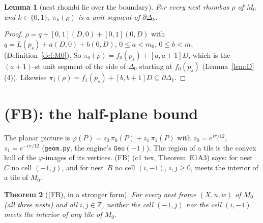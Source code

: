 \documentclass[11pt]{article}
\newtheorem{theorem}{Theorem}\newtheorem{lemma}[theorem]{Lemma}\newtheorem{proposition}[theorem]{Proposition}
\theoremstyle{definition}\newtheorem{definition}[theorem]{Definition}\newtheorem{remark}[theorem]{Remark}
\newcommand{\Z}{\mathbb Z}\newcommand{\R}{\mathbb R}
\begin{document}
\begin{lemma}[nest rhombi lie over the boundary]\label{lem:N}
For every nest rhombus $\rho$ of $M_0$ and $k\in\{0,1\}$, $\pi_k(\rho)$ is a unit segment of $\partial\Delta_k$.
\end{lemma}
\begin{proof}
$\rho=q+[0,1](D,0)+[0,1](0,D)$ with $q=L(p_s)+a(D,0)+b(0,D)$, $0\le a<m_0$, $0\le b<m_1$ (Definition~\ref{def:M0}). So $\pi_0(\rho)=f_0(p_s)+[a,a+1]D$, which is the $(a+1)$-st unit segment of the side of $\Delta_0$ starting at $f_0(p_s)$ (Lemma~\ref{lem:D}(4)). Likewise $\pi_1(\rho)=f_1(p_s)+[b,b+1]D\subseteq\partial\Delta_1$.
\end{proof}

\section{(FB): the half-plane bound}\label{sec:FB}
The planar picture is $\varphi(P)=z_0\,\pi_0(P)+z_1\,\pi_1(P)$ with $z_0=e^{i\pi/12}$, $z_1=e^{-i\pi/12}$ (\texttt{geom.py}, the engine's $\texttt{Geo}(-1)$). The region of a tile is the convex hull of the $\varphi$-images of its vertices. (FB) (c1 tex, Theorem~E1A3) says: for nest~$C$ no cell $(-1,j)$, and for nest~$B$ no cell $(i,-1)$, $i,j\ge0$, meets the interior of a tile of $M_0$.
\begin{theorem}[(FB), in a stronger form]\label{thm:FB}
For every nest frame $(X,u,w)$ of $M_0$ (all three nests) and all $i,j\in\Z$, neither the cell $(-1,j)$ nor the cell $(i,-1)$ meets the interior of any tile of $M_0$.
\end{theorem}
\end{document}
